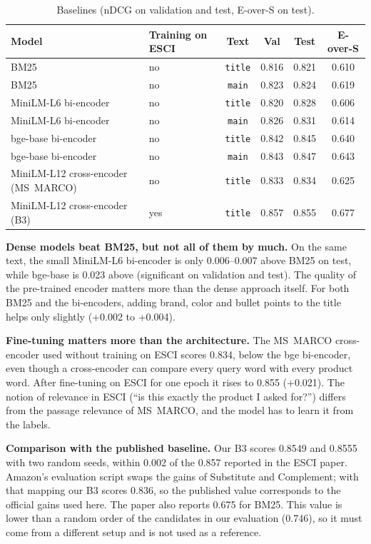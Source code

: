 \documentclass[12pt,a4paper]{report}
\begin{document}
\begin{table}[H]
\centering
\caption{Baselines (nDCG on validation and test, E-over-S on test).}
\label{tab:baselines}
\small
\begin{tabular}{@{}llcccc@{}}
\toprule
\textbf{Model} & \textbf{Training on ESCI} & \textbf{Text} & \textbf{Val} & \textbf{Test} & \textbf{E-over-S} \\
\midrule
BM25 & no & \texttt{title} & 0.816 & 0.821 & 0.610 \\
BM25 & no & \texttt{main} & 0.823 & 0.824 & 0.619 \\
MiniLM-L6 bi-encoder & no & \texttt{title} & 0.820 & 0.828 & 0.606 \\
MiniLM-L6 bi-encoder & no & \texttt{main} & 0.826 & 0.831 & 0.614 \\
bge-base bi-encoder & no & \texttt{title} & 0.842 & 0.845 & 0.640 \\
bge-base bi-encoder & no & \texttt{main} & 0.843 & 0.847 & 0.643 \\
MiniLM-L12 cross-encoder (MS~MARCO) & no & \texttt{title} & 0.833 & 0.834 & 0.625 \\
MiniLM-L12 cross-encoder (B3) & yes & \texttt{title} & 0.857 & 0.855 & 0.677 \\
\bottomrule
\end{tabular}
\end{table}

\textbf{Dense models beat BM25, but not all of them by much.} On the same text, the small MiniLM-L6 bi-encoder is only 0.006--0.007 above BM25 on test, while bge-base is 0.023 above (significant on validation and test). The quality of the pre-trained encoder matters more than the dense approach itself. For both BM25 and the bi-encoders, adding brand, color and bullet points to the title helps only slightly (+0.002 to +0.004).

\textbf{Fine-tuning matters more than the architecture.} The MS~MARCO cross-encoder used without training on ESCI scores 0.834, below the bge bi-encoder, even though a cross-encoder can compare every query word with every product word. After fine-tuning on ESCI for one epoch it rises to 0.855 (+0.021). The notion of relevance in ESCI (``is this exactly the product I asked for?'') differs from the passage relevance of MS~MARCO, and the model has to learn it from the labels.

\textbf{Comparison with the published baseline.} Our B3 scores 0.8549 and 0.8555 with two random seeds, within 0.002 of the 0.857 reported in the ESCI paper. Amazon's evaluation script swaps the gains of Substitute and Complement; with that mapping our B3 scores 0.836, so the published value corresponds to the official gains used here. The paper also reports 0.675 for BM25. This value is lower than a random order of the candidates in our evaluation (0.746), so it must come from a different setup and is not used as a reference.
\end{document}
